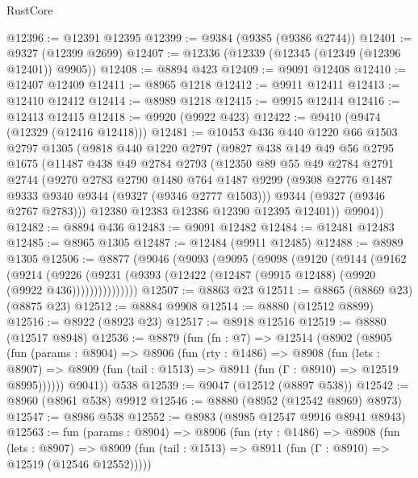 \begin{lexlean}{RustCore}
\begin{coremodule}
@12396 := @12391 @12395
@12399 := @9384 (@9385 (@9386 @2744))
@12401 := @9327 (@12399 @2699)
@12407 := @12336 (@12339 (@12345 (@12349 (@12396 @12401)) @9905))
@12408 := @8894 @423
@12409 := @9091 @12408
@12410 := @12407 @12409
@12411 := @8965 @1218
@12412 := @9911 @12411
@12413 := @12410 @12412
@12414 := @8989 @1218
@12415 := @9915 @12414
@12416 := @12413 @12415
@12418 := @9920 (@9922 @423)
@12422 := @9410 (@9474 (@12329 (@12416 @12418)))
@12481 := @10453
    @436
    @440
    @1220
    @66
    @1503
    @2797
    @1305
    (@9818
      @440
      @1220
      @2797
      (@9827
        @438
        @149
        @49
        @56
        @2795
        @1675
        (@11487
          @438
          @49
          @2784
          @2793
          (@12350
            @89
            @55
            @49
            @2784
            @2791
            @2744
            (@9270
              @2783
              @2790
              @1480
              @764
              @1487
              @9299
              (@9308 @2776 @1487 @9333 @9340 @9344 (@9327 (@9346 @2777 @1503)))
              @9344
              (@9327 (@9346 @2767 @2783)))
            @12380
            @12383
            @12386
            @12390
            @12395
            @12401))
        @9904))
@12482 := @8894 @436
@12483 := @9091 @12482
@12484 := @12481 @12483
@12485 := @8965 @1305
@12487 := @12484 (@9911 @12485)
@12488 := @8989 @1305
@12506 := @8877
    (@9046
      (@9093
        (@9095
          (@9098
            (@9120
              (@9144
                (@9162
                  (@9214
                    (@9226
                      (@9231 (@9393 (@12422 (@12487 (@9915 @12488) (@9920 (@9922 @436)))))))))))))))
@12507 := @8863 @23
@12511 := @8865 (@8869 @23) (@8875 @23)
@12512 := @8884 @9908
@12514 := @8880 (@12512 @8899)
@12516 := @8922 (@8923 @23)
@12517 := @8918 @12516
@12519 := @8880 (@12517 @8948)
@12536 := @8879
    (fun (fn : @7) =>
    @12514
      (@8902
        (@8905
          (fun (params : @8904) =>
          @8906
            (fun (rty : @1486) =>
            @8908
              (fun (lets : @8907) =>
              @8909 (fun (tail : @1513) => @8911 (fun (Γ : @8910) => @12519 @8995))))))
        @9041))
    @538
@12539 := @9047 (@12512 (@8897 @538))
@12542 := @8960 (@8961 @538) @9912
@12546 := @8880 (@8952 (@12542 @8969) @8973)
@12547 := @8986 @538
@12552 := @8983 (@8985 @12547 @9916 @8941 @8943)
@12563 := fun (params : @8904) =>
  @8906
    (fun (rty : @1486) =>
    @8908
      (fun (lets : @8907) =>
      @8909 (fun (tail : @1513) => @8911 (fun (Γ : @8910) => @12519 (@12546 @12552)))))

\end{coremodule}
\end{lexlean}
